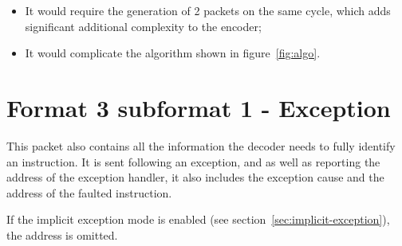 \begin{itemize}
  \item It would require the generation of 2 packets on the same cycle, which adds significant additional complexity
    to the encoder;
  \item It would complicate the algorithm shown in figure~\ref{fig:algo}. 
\end{itemize}

\FloatBarrier
\section{Format 3 subformat 1 - Exception} \label{sec:format31}

This packet also contains all the information the decoder needs to fully identify an instruction.
It is sent following an exception, and as well as reporting the address of the exception handler, it also 
includes the exception cause and the address of the faulted instruction.

If the implicit exception mode is enabled (see section~\ref{sec:implicit-exception}), the address is omitted.

